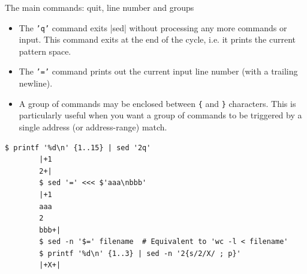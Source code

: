 \begin{frame}[fragile]{The main commands: quit, line number and groups}
    \vspace{-1mm}
    \begin{itemize}
        \item The \texttt{'q'} command exits \bash|sed| without processing any more commands or input.
              This command exits at the end of the cycle, i.e. it prints the current pattern space.
        \item The \texttt{'='} command prints out the current input line number (with a trailing newline).
        \item A group of commands may be enclosed between \texttt{\{} and \texttt{\}} characters.
              This is particularly useful when you want a group of commands to be triggered by a single address (or address-range) match.
    \end{itemize}
    \begin{lstlisting}[style=MyBash]
        $ printf '%d\n' {1..15} | sed '2q'
        |+1
        2+|
        $ sed '=' <<< $'aaa\nbbb'
        |+1
        aaa
        2
        bbb+|
        $ sed -n '$=' filename  # Equivalent to 'wc -l < filename'
        $ printf '%d\n' {1..3} | sed -n '2{s/2/X/ ; p}'
        |+X+|
    \end{lstlisting}
\end{frame}




